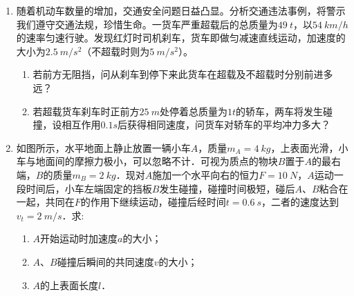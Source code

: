 \begin{enumerate}[leftmargin=0em]
{}


\item 
{}
随着机动车数量的增加，交通安全问题日益凸显。分析交通违法事例，将警示我们遵守交通法规，珍惜生命。一货车严重超载后的总质量为$ 49\ t $，以$ 54 \ km/h $的速率匀速行驶。发现红灯时司机刹车，货车即做匀减速直线运动，加速度的大小为$ 2.5 \ m/s^{2} $（不超载时则为$ 5 \ m/s^{2} $）。
\begin{enumerate}
\renewcommand{\labelenumi}{\arabic{enumi}.}
\item
若前方无阻挡，问从刹车到停下来此货车在超载及不超载时分别前进多远？
\item 
若超载货车刹车时正前方$ 25 \ m $处停着总质量为$ 1t $的轿车，两车将发生碰撞，设相互作用$ 0.1s $后获得相同速度，问货车对轿车的平均冲力多大？

\end{enumerate}




\newpage
\item 
{}
如图所示，水平地面上静止放置一辆小车$ A $，质量$ m_{A} =4 \ kg $，上表面光滑，小车与地面间的摩擦力极小，可以忽略不计．可视为质点的物块$ B $置于$ A $的最右端，$ B $的质量$ m_{B} =2 \ kg $．现对$ A $施加一个水平向右的恒力$ F=10 \ N $，$ A $运动一段时间后，小车左端固定的挡板$ B $发生碰撞，碰撞时间极短，碰后$ A $、$ B $粘合在一起，共同在$ F $的作用下继续运动，碰撞后经时间$ t=0.6\ s $，二者的速度达到$ v_t=2 \ m/s $．求:
\begin{enumerate}
\renewcommand{\labelenumi}{\arabic{enumi}.}
\item
$ A $开始运动时加速度$ a $的大小；
\item 
$ A $、$ B $碰撞后瞬间的共同速度$ v $的大小；
\item 
$ A $的上表面长度$ l $．


\end{enumerate}
\end{enumerate}

